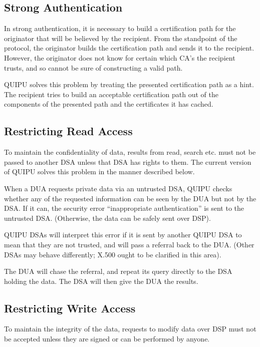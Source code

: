 \subsection{Strong Authentication}

In strong authentication, it is necessary to build a certification path
for the originator that will be believed by the recipient. From the standpoint
of the protocol, the originator builds the certification path and sends it to
the recipient. However, the originator does not know for certain which CA's
the recipient trusts, and so cannot be sure of constructing a valid path.

QUIPU solves this problem by treating the presented certification path
as a hint. The recipient tries to build an acceptable certification path
out of the components of the presented path and the certificates it has cached.

\subsection{Restricting Read Access}

To maintain the confidentiality of data, results from read, search etc. must
not be passed to another DSA unless that DSA has rights to them.
The current version of QUIPU solves this problem in the manner described below.

When a DUA requests private data via an untrusted DSA, QUIPU checks whether
any of the requested information can be seen by the DUA but not by the DSA.
If it can, the security error ``inappropriate authentication'' is sent to
the untrusted DSA. (Otherwise, the data can be safely sent over DSP).

QUIPU DSAs will interpret this error if it is sent by another QUIPU DSA 
to mean that they are not trusted, and
will pass a referral back to the DUA. (Other DSAs may behave differently;
X.500 ought to be clarified in this area).

The DUA will chase the referral, and repeat its query directly to the DSA
holding the data. The DSA will then give the DUA the results.

\subsection{Restricting Write Access}

To maintain the integrity of the data, requests to modify data over DSP must
not be accepted unless they are signed or can be performed by anyone.

